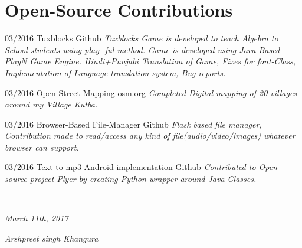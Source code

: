 \documentclass[]{friggeri-cv}
\begin{document}
\section{Open-Source Contributions}
\begin{entrylist}
 \entry
    {03/2016}
    {Tuxblocks}
    {Github}
    {\emph{Tuxblocks Game is developed to teach Algebra to School students using play-
ful method. Game is developed using Java Based PlayN Game Engine.
Hindi+Punjabi Translation of Game, Fixes for font-Class, Implementation of
Language translation system, Bug reports.}}

 \entry
    {03/2016}
    {Open Street Mapping}
    {osm.org}
    {\emph{Completed Digital mapping of 20 villages around my Village Kutba.}}

 \entry
    {03/2016}
    {Browser-Based File-Manager}
    {Github}
    {\emph{Flask based file manager, Contribution made to read/access any kind of
file(audio/video/images) whatever browser can support.}}

 \entry
    {03/2016}
    {Text-to-mp3 Android implementation}
    {Github}
    {\emph{Contributed to Open-source project Plyer by creating Python wrapper around
Java Classes.}}

      
\end{entrylist}


\\
\begin{flushleft}
\emph{March 11th, 2017}
\end{flushleft}
\begin{flushright}
\emph{Arshpreet singh Khangura}
\end{flushright}
\end{document}
